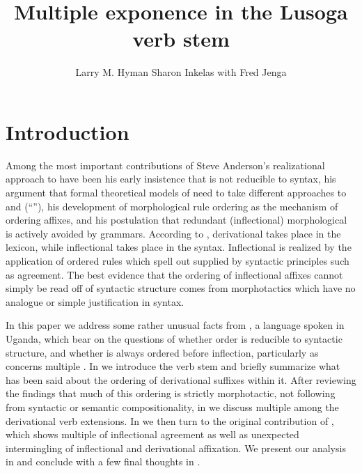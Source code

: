 \documentclass[output=paper,
modfonts
]{LSP/langsci}
\title{Multiple exponence in the Lusoga verb stem}
\author{%
Larry M. Hyman\affiliation{University of California, Berkeley}\lastand 
Sharon Inkelas\affiliation{University of California, Berkeley}
\newlineCover\newlineCover 
with Fred Jenga\affiliation{University of Texas, Austin}
}
\begin{document}
\maketitle
{}
\section{Introduction}

Among the most important contributions of Steve Anderson's realizational
approach to  have been his early insistence that  is
not reducible to syntax, his argument that formal theoretical models of
 need to take different approaches to  and
 (``''), his development of morphological rule
ordering as the mechanism of ordering affixes, and his postulation that
redundant (inflectional) morphological  is actively avoided by
grammars. According to \citet{anderson1992}, derivational  takes
place in the lexicon, while inflectional  takes place in the
syntax. Inflectional  is realized by the application of
ordered rules which spell out  supplied by syntactic principles
such as agreement. The best evidence that the ordering of inflectional
affixes cannot simply be read off of syntactic structure comes from
morphotactics which have no analogue or simple justification in syntax.

In this paper we address some rather unusual facts from , a 
language spoken in Uganda, which bear on the questions of whether 
order is reducible to syntactic structure, and whether  is
always ordered before inflection, particularly as concerns multiple
. In  we introduce the  verb stem and briefly summarize
what has been said about the ordering of derivational suffixes within
it. After reviewing the findings that much of this ordering is strictly
morphotactic, not following from syntactic  or semantic
compositionality, in  we discuss multiple  among the 
derivational verb extensions. In  we then turn to the original
contribution of , which shows multiple  of inflectional
agreement as well as unexpected intermingling of inflectional and
derivational affixation. We present our analysis in  and conclude with
a few final thoughts in .
\end{document}
